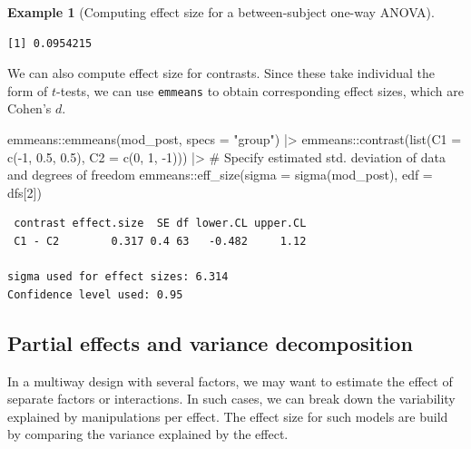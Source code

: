 \documentclass[
  11pt,
  letterpaper,
]{scrbook}
\newenvironment{Shaded}{\begin{snugshade}}{\end{snugshade}}
\newcommand{\AttributeTok}[1]{\textcolor[rgb]{0.40,0.45,0.13}{#1}}
\newcommand{\CommentTok}[1]{\textcolor[rgb]{0.37,0.37,0.37}{#1}}
\newcommand{\DecValTok}[1]{\textcolor[rgb]{0.68,0.00,0.00}{#1}}
\newcommand{\FloatTok}[1]{\textcolor[rgb]{0.68,0.00,0.00}{#1}}
\newcommand{\FunctionTok}[1]{\textcolor[rgb]{0.28,0.35,0.67}{#1}}
\newcommand{\NormalTok}[1]{\textcolor[rgb]{0.00,0.23,0.31}{#1}}
\newcommand{\SpecialCharTok}[1]{\textcolor[rgb]{0.37,0.37,0.37}{#1}}
\newcommand{\StringTok}[1]{\textcolor[rgb]{0.13,0.47,0.30}{#1}}
\theoremstyle{definition}
\theoremstyle{definition}
\newtheorem{example}{Example}[chapter]
\theoremstyle{remark}
\begin{document}
\begin{example}[Computing effect size for a between-subject one-way
ANOVA]
\begin{verbatim}
[1] 0.0954215
\end{verbatim}

We can also compute effect size for contrasts. Since these take
individual the form of \(t\)-tests, we can use \texttt{emmeans} to
obtain corresponding effect sizes, which are Cohen's \(d\).

\begin{Shaded}
\begin{Highlighting}[]
\NormalTok{emmeans}\SpecialCharTok{::}\FunctionTok{emmeans}\NormalTok{(mod\_post, }\AttributeTok{specs =} \StringTok{"group"}\NormalTok{) }\SpecialCharTok{|\textgreater{}} 
\NormalTok{  emmeans}\SpecialCharTok{::}\FunctionTok{contrast}\NormalTok{(}\FunctionTok{list}\NormalTok{(}\AttributeTok{C1 =} \FunctionTok{c}\NormalTok{(}\SpecialCharTok{{-}}\DecValTok{1}\NormalTok{, }\FloatTok{0.5}\NormalTok{, }\FloatTok{0.5}\NormalTok{), }
                         \AttributeTok{C2 =} \FunctionTok{c}\NormalTok{(}\DecValTok{0}\NormalTok{, }\DecValTok{1}\NormalTok{, }\SpecialCharTok{{-}}\DecValTok{1}\NormalTok{))) }\SpecialCharTok{|\textgreater{}}
\CommentTok{\# Specify estimated std. deviation of data and degrees of freedom }
\NormalTok{  emmeans}\SpecialCharTok{::}\FunctionTok{eff\_size}\NormalTok{(}\AttributeTok{sigma =} \FunctionTok{sigma}\NormalTok{(mod\_post), }\AttributeTok{edf =}\NormalTok{ dfs[}\DecValTok{2}\NormalTok{])}
\end{Highlighting}
\end{Shaded}

\begin{verbatim}
 contrast effect.size  SE df lower.CL upper.CL
 C1 - C2        0.317 0.4 63   -0.482     1.12

sigma used for effect sizes: 6.314 
Confidence level used: 0.95 
\end{verbatim}

\end{example}

\subsection{Partial effects and variance
decomposition}\label{partial-effects-and-variance-decomposition}

In a multiway design with several factors, we may want to estimate the
effect of separate factors or interactions. In such cases, we can break
down the variability explained by manipulations per effect. The effect
size for such models are build by comparing the variance explained by
the effect.
\end{document}
